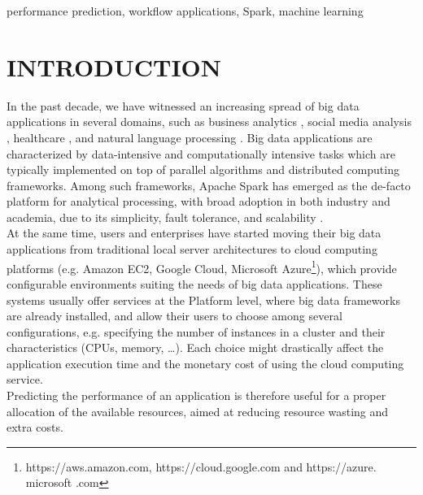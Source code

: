 \documentclass[a4paper, 10pt, conference]{ieeeconf}      %
\begin{document}
\begin{keywords}
performance prediction, workflow applications, Spark, machine learning
\end{keywords}

\section{INTRODUCTION}
In the past decade, we have witnessed an increasing spread of big data applications in several domains, such as business analytics \cite{sun2018big}, social media analysis \cite{ghani2019social}, healthcare \cite{kulkarni2020big}, and natural language processing \cite{Hirschberg261}.
Big data applications are characterized by data-intensive and computationally intensive tasks which are typically implemented on top of  parallel algorithms and distributed computing frameworks. Among such frameworks, Apache Spark has emerged as the de-facto platform for analytical processing, with broad adoption in both industry and academia, due to its simplicity, fault tolerance, and scalability \cite{Hirschberg261}.\\
At the same time, users and enterprises have started moving their big data applications from  traditional local server architectures to cloud computing platforms (e.g. Amazon EC2, Google Cloud, Microsoft Azure\footnote{https://aws.amazon.com, https://cloud.google.com and https://azure. microsoft .com }), which provide configurable environments suiting the needs of big data applications.
These systems usually offer services at the Platform level, where big data  frameworks are already installed, and allow their users to choose among several configurations, e.g. specifying the number of instances in a cluster and their characteristics (CPUs, memory, \ldots).
Each choice might drastically affect  the application execution time and the monetary cost of using the cloud computing service.\\
Predicting the performance of an application is therefore useful for a proper allocation of the available resources, aimed at reducing resource wasting and extra costs.
\end{document}
